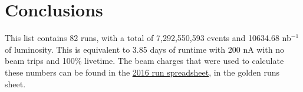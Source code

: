 \documentclass[11pt]{article}
\begin{document}
\section{Conclusions}
This list contains 82 runs, with a total of 7,292,550,593 events and 10634.68 nb$^{-1}$ of luminosity.  This is equivalent to 3.85 days of runtime with 200 nA with no beam trips and 100\% livetime.  The beam charges that were used to calculate these numbers can be found in the \href{https://docs.google.com/spreadsheets/d/1X_TfOQyQBv9Ja1IQ5LYImk0sd00eN-d4zzkCwn-CSUM/edit#gid=43855609}{\underline{2016 run spreadsheet}}, in the golden runs sheet.
\end{document}
